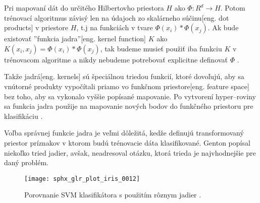 Pri mapovaní dát do určitého Hilbertovho priestora \cite{prop:HilbertSpace} $H$ ako $\Phi:R^d \rightarrow H$.
Potom trénovací algoritmus závisý len na údajoch zo skalárneho súčinu[eng. dot products] v priestore $H$, t.j na funkciách v tvare $\Phi(x_i) * \Phi(x_j)$.
Ak bude existovať ''funkcia jadra''[eng. kernel function] $K$ ako $K(x_i, x_j) = \Phi(x_i)*\Phi(x_j)$, tak budeme musieť použiť iba funkciu $K$ v trénovacom algoritme
    a nikdy nebudeme potrebovať explicitne definovať $\Phi$ \cite{prop:SupervisedMachineLearning}.

Takže jadrá[eng. kernels] sú špeciálnou triedou funkcií, ktoré dovoľujú, aby sa vnútorné produkty vypočítali priamo vo funkčnom priestore[eng. feature space] bez toho, aby sa vykonalo vyššie popísané mapovanie.
Po vytvorení hyper--roviny sa funkcia jadra použije na mapovanie nových bodov do funkčného priestoru pre klasifikáciu \cite{prop:SupervisedMachineLearning}.

Voľba správnej funkcie jadra je veľmi dôležitá, kedže definujú transformovaný priestor príznakov v ktorom budú trénovacie dáta klasifikované.
Genton \cite{prop:KernelClasses} popísal niekoľko tried jadier, avšak, neadresoval otázku, ktorá trieda je najvhodnejšie pre daný problém.

\begin{comment}
    Zoznam populárnych jadier\cite{prop:SupervisedMachineLearning}:
    \begin{equation}
        K(x, y) = (x*y+1)^P
    \end{equation}
    \begin{equation}
        K(x, y) = e^{\frac{-||x-y||^2}{2 \sigma^2}}
    \end{equation}
    \begin{equation}
        K(x, y) = tanh(\kappa x*y - \delta)^P
    \end{equation}
\end{comment}


\begin{figure}[H]
	\centering
	\texttt{[image: sphx\_glr\_plot\_iris\_0012]}
	\caption{Porovnanie SVM klasifikátora s použitím rôznym jadier \cite{odkaz:SVMImage}.}
	\label{pic:SVMComparison}
\end{figure}



